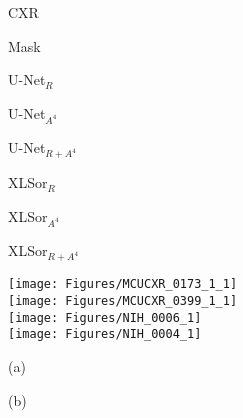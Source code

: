 \documentclass{midl} \usepackage{multirow}
\begin{document}
\begin{figure}[t!]
\tiny{
    \begin{minipage}[b]{0.12\linewidth}
		\centering
\centerline{CXR}
	\end{minipage}
	\begin{minipage}[b]{0.12\linewidth}
		\centering
\centerline{Mask}
	\end{minipage}
	\begin{minipage}[b]{0.12\linewidth}
		\centering
\centerline{U-Net$_{R}$}
	\end{minipage}
	\begin{minipage}[b]{0.12\linewidth}
		\centering
\centerline{U-Net$_{A^4}$}
	\end{minipage}
	\begin{minipage}[b]{0.11\linewidth}
		\centering
\centerline{U-Net$_{R+A^4}$}
	\end{minipage}
	\begin{minipage}[b]{0.12\linewidth}
		\centering
\centerline{XLSor$_{R}$}
	\end{minipage}
	\begin{minipage}[b]{0.11\linewidth}
		\centering
\centerline{XLSor$_{A^4}$}
	\end{minipage}
	\begin{minipage}[b]{0.12\linewidth}
		\centering
\centerline{XLSor$_{R+A^4}$}
	\end{minipage}}
	\begin{minipage}[b]{1.0\linewidth}
		\centering
		\texttt{[image: Figures/MCUCXR\_0173\_1\_1]} \\
		\vspace{0.05cm}
		\texttt{[image: Figures/MCUCXR\_0399\_1\_1]} \\
		\vspace{0.05cm}
		\texttt{[image: Figures/NIH\_0006\_1]} \\
		\vspace{0.05cm}
		\texttt{[image: Figures/NIH\_0004\_1]} \\
	\end{minipage}
\normalsize{
	\begin{minipage}[b]{0.122\linewidth}
		\centering
		\vspace{0.2cm}
		\centerline{(a)}\medskip
	\end{minipage}
	\begin{minipage}[b]{0.12\linewidth}
		\centering
		\vspace{0.2cm}
		\centerline{(b)}\medskip
	\end{minipage}
}
\end{figure}
\end{document}

